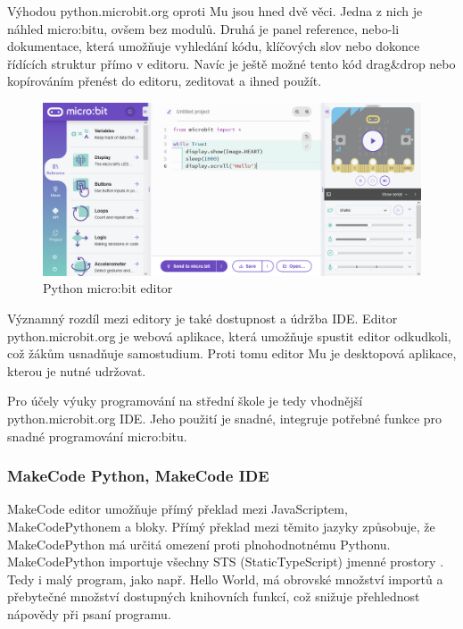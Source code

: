 \documentclass[
  digital,     %
  oneside,     %
  nosansbold,  %
  colorbold, %
  lof,         %
  nolot,         %
]{fithesis4}
\begin{document}
Výhodou python.microbit.org oproti Mu jsou hned dvě věci. Jedna z nich je náhled micro:bitu, ovšem bez modulů. Druhá je panel reference, nebo-li dokumentace, která umožňuje vyhledání kódu, klíčových slov nebo dokonce řídících struktur přímo v editoru. Navíc je ještě možné tento kód drag\&drop nebo kopírováním přenést do editoru, zeditovat a ihned použít. 

\begin{figure}[ht]
    \centering
    \includegraphics[width=\textwidth]  {images/pythonMBE.png}
    \caption{Python micro:bit editor}
    \label{MicroBitED}
\end{figure}

Významný rozdíl mezi editory je také dostupnost a údržba IDE. Editor python.microbit.org je webová aplikace, která umožňuje spustit editor odkudkoli, což žákům usnadňuje samostudium. Proti tomu editor Mu je desktopová aplikace, kterou je nutné udržovat. 

Pro účely výuky programování na střední škole je tedy vhodnější python.microbit.org IDE. Jeho použití je snadné, integruje potřebné funkce pro snadné programování micro:bitu.

\subsubsection{MakeCode Python, MakeCode IDE}

MakeCode editor umožňuje přímý překlad mezi JavaScriptem, MakeCodePythonem a bloky. Přímý překlad mezi těmito jazyky způsobuje, že MakeCodePython má určitá omezení proti plnohodnotnému Pythonu. MakeCodePython importuje všechny STS (StaticTypeScript) jmen\-né prostory \cite{makeCodePython}. Tedy i malý program, jako např. Hello World, má obrovské množství importů a přebytečné množství dostupných knihovních funkcí, což snižuje přehlednost nápovědy při psaní programu.
\end{document}
